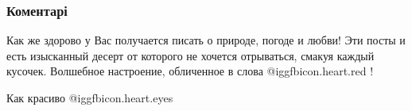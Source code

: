  
 
 
 
 
\subsubsection{Коментарі}

\begin{itemize} %
Как же здорово у Вас получается писать о природе, погоде и любви! Эти посты и есть изысканный десерт от которого не хочется отрываться, смакуя каждый кусочек. Волшебное настроение, обличенное в слова @igg{fbicon.heart.red} !

Как красиво  @igg{fbicon.heart.eyes} 
\end{itemize} %
